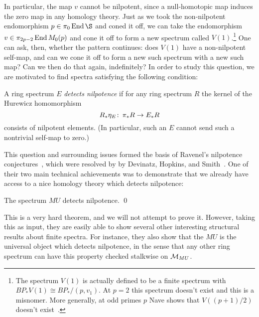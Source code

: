 \noindent In particular, the map $v$ cannot be nilpotent, since a null-homotopic map induces the zero map in any homology theory.  Just as we took the non-nilpotent endomorphism $p \in \pi_0 \End \S$ and coned it off, we can take the endomorphism $v \in \pi_{2p-2} \operatorname{End} M_0(p)$ and cone it off to form a new spectrum called $V(1)$.\footnote{The spectrum $V(1)$ is actually defined to be a finite spectrum with $BP_* V(1) \cong BP_* / (p, v_1)$. At $p = 2$ this spectrum doesn't exist and this is a misnomer.  More generally, at odd primes $p$ Nave shows that $V((p+1)/2)$ doesn't exist~\cite[Theorem 1.3]{Nave}.}  One can ask, then, whether the pattern continues: does $V(1)$ have a non-nilpotent self-map, and can we cone it off to form a new such spectrum with a new such map?  Can we then do that again, indefinitely?  In order to study this question, we are motivated to find spectra satisfying the following condition:

\begin{definition}
A ring spectrum $E$ \textit{detects nilpotence} if for any ring spectrum $R$ the kernel of the Hurewicz homomorphism \[R_*\eta_E\colon\thinspace \pi_* R \to E_* R\] consists of nilpotent elements.  (In particular, such an $E$ cannot send such a nontrivial self-map to zero.)
\end{definition}

This question and surrounding issues formed the basis of Ravenel's nilpotence conjectures~\cite[Section 10]{RavenelLocalizationWRTPeriodic}, which were resolved by by Devinatz, Hopkins, and Smith~\cite{DHS,HopkinsSmith}.  One of their two main technical achievements was to demonstrate that we already have access to a nice homology theory which detects nilpotence:

\begin{theorem}\label{DevinatzHopkinsSmith}
The spectrum $MU$ detects nilpotence. \qed
\end{theorem}

\noindent This is a very hard theorem, and we will not attempt to prove it.
However, taking this as input, they are easily able to show several other interesting structural results about finite spectra.  For instance, they also show that the $MU$ is the universal object which detects nilpotence, in the sense that any other ring spectrum can have this property checked stalkwise on $\mathcal{M}_{MU}$.

